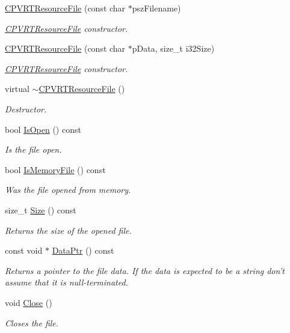 \begin{DoxyCompactItemize}
\item 
\hyperlink{class_c_p_v_r_t_resource_file_af38b20d1dc37e8866ea3f5ee7972a1c7}{C\+P\+V\+R\+T\+Resource\+File} (const char $\ast$psz\+Filename)
\begin{DoxyCompactList}\small\item\em \hyperlink{class_c_p_v_r_t_resource_file}{C\+P\+V\+R\+T\+Resource\+File} constructor. \end{DoxyCompactList}\item 
\hyperlink{class_c_p_v_r_t_resource_file_a632912bcf0a15ba5d2c728c7bff3b0bc}{C\+P\+V\+R\+T\+Resource\+File} (const char $\ast$p\+Data, size\+\_\+t i32\+Size)
\begin{DoxyCompactList}\small\item\em \hyperlink{class_c_p_v_r_t_resource_file}{C\+P\+V\+R\+T\+Resource\+File} constructor. \end{DoxyCompactList}\item 
virtual \hyperlink{class_c_p_v_r_t_resource_file_a7f6f5811fc3eb5e7b2d965fbb58b5281}{$\sim$\+C\+P\+V\+R\+T\+Resource\+File} ()
\begin{DoxyCompactList}\small\item\em Destructor. \end{DoxyCompactList}\item 
bool \hyperlink{class_c_p_v_r_t_resource_file_a484df820e9829438c0601bbc0aef7797}{Is\+Open} () const 
\begin{DoxyCompactList}\small\item\em Is the file open. \end{DoxyCompactList}\item 
bool \hyperlink{class_c_p_v_r_t_resource_file_a786f1ab4c2201205cc8af60132c9e12a}{Is\+Memory\+File} () const 
\begin{DoxyCompactList}\small\item\em Was the file opened from memory. \end{DoxyCompactList}\item 
size\+\_\+t \hyperlink{class_c_p_v_r_t_resource_file_adfd470f542fd27ee904966b116afd617}{Size} () const 
\begin{DoxyCompactList}\small\item\em Returns the size of the opened file. \end{DoxyCompactList}\item 
const void $\ast$ \hyperlink{class_c_p_v_r_t_resource_file_af3da413665ad9e932ae95676f3605781}{Data\+Ptr} () const 
\begin{DoxyCompactList}\small\item\em Returns a pointer to the file data. If the data is expected to be a string don't assume that it is null-\/terminated. \end{DoxyCompactList}\item 
void \hyperlink{class_c_p_v_r_t_resource_file_a3755e05b721b83a2fe20c81c9376bab3}{Close} ()
\begin{DoxyCompactList}\small\item\em Closes the file. \end{DoxyCompactList}\end{DoxyCompactItemize}
